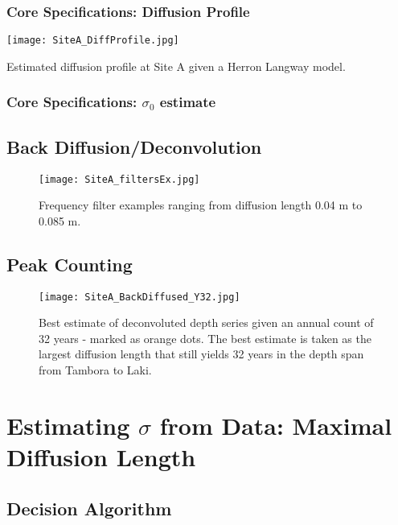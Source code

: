 \documentclass[../../CompleteThesis/Complete_1stDraft.tex]{subfiles}
\begin{document}
\subsubsection[Diffusion Profile]{Core Specifications: Diffusion Profile}
\begin{marginfigure}
	\centering
	\texttt{[image: SiteA\_DiffProfile.jpg]}
	\caption[Diffusion profile, Site A.]{\footnotesize{Estimated diffusion profile at Site A given a Herron Langway model.}}
	\label{fig:SiteADiffProfile}
\end{marginfigure}

\subsubsection[$\sigma_0$ estimate]{Core Specifications: $\sigma_0$ estimate}

\subsection[Back Diffusion]{Back Diffusion/Deconvolution}
\begin{figure}[h]
	\centering
	\texttt{[image: SiteA\_filtersEx.jpg]}
	\caption[Frequency filters example, Site A]{Frequency filter examples ranging from diffusion length 0.04 m to 0.085 m.}
	\label{fig:SiteA_filtersEx}
\end{figure}

\subsection[Peak Counting]{Peak Counting}

\begin{figure}
	\centering
	\texttt{[image: SiteA\_BackDiffused\_Y32.jpg]}
	\caption[Best estimate of deconvoluted depth series, Site A]{Best estimate of deconvoluted depth series given an annual count of 32 years - marked as orange dots. The best estimate is taken as the largest diffusion length that still yields 32 years in the depth span from Tambora to Laki.}
	\label{fig:SiteA_BackDiffused_Y32}
\end{figure}

\section[Maximal $\sigma$ Estimate]{Estimating $\sigma$ from Data: Maximal Diffusion Length}

\subsection[Decision algorithm]{Decision Algorithm}
\end{document}
